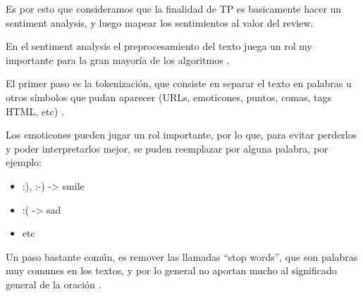 Es por esto que consideramos que la finalidad de TP es basicamente hacer un sentiment analysis, y
luego mapear los sentimientos al valor del review.

En el sentiment analysis el preprocesamiento del texto juega un rol my importante para la gran
mayor\'ia de los algoritmos \cite{importance_of_preprocessing}.

El primer paso es la tokenizaci\'on, que consiste en separar el texto en palabras u otros s\'imbolos
que pudan aparecer (URLs, emoticones, puntos, comas, tags HTML, etc) \cite{mining_twitter_data}.

Los emoticones pueden jugar un rol importante, por lo que, para evitar perderlos y poder
interpretarlos mejor, se puden reemplazar por alguna palabra, por ejemplo:

\begin{itemize}
\setlength\itemsep{0em}
  \item :), :-) -> smile
  \item :( -> sad
  \item etc
\end{itemize}

Un paso bastante com\'un, es remover las llamadas ``stop words'', que son palabras muy comunes en
los textos, y por lo general no aportan mucho al significado general de la oraci\'on \cite{stopwords}.
